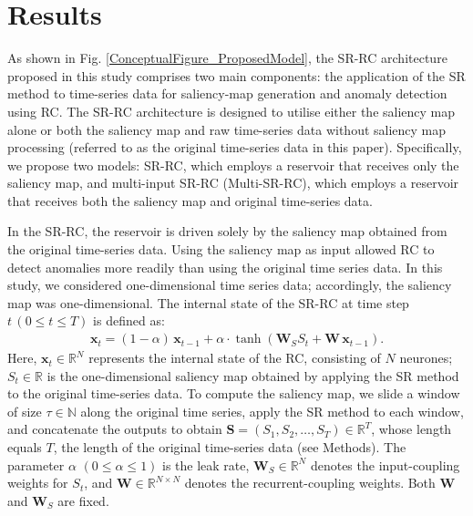 \documentclass[pdflatex,sn-nature]{sn-jnl}
\theoremstyle{thmstyleone}%
\theoremstyle{thmstyletwo}%
\theoremstyle{thmstylethree}%
\begin{document}
\section*{Results}
As shown in Fig. \ref{ConceptualFigure_ProposedModel}, the SR-RC architecture proposed in this study comprises two main components: the application of the SR method to time-series data for saliency-map generation and anomaly detection using RC.
The SR-RC architecture is designed to utilise either the saliency map alone or both the saliency map and raw time-series data without saliency map processing (referred to as the original time-series data in this paper).
Specifically, we propose two models: SR-RC, which employs a reservoir that receives only the saliency map, and multi-input SR-RC (Multi-SR-RC), which employs a reservoir that receives both the saliency map and original time-series data.

In the SR-RC, the reservoir is driven solely by the saliency map obtained from the original time-series data.
Using the saliency map as input allowed RC to detect anomalies more readily than using the original time series data.
In this study, we considered one-dimensional time series data; accordingly, the saliency map was one-dimensional.
The internal state of the SR-RC at time step $t\,(0 \le t \le T)$ is defined as:
\begin{align}
    \mathbf{x}_{t} = (1-\alpha)\,\mathbf{x}_{t-1} + \alpha \cdot \tanh\left(\mathbf{W}_{S}S_{t} + \mathbf{W}\,\mathbf{x}_{t-1}\right). \label{eq:SR-RC}
\end{align}
Here, $\mathbf{x}_{t} \in \mathbb{R}^{N}$ represents the internal state of the RC, consisting of $N$ neurones; $S_{t} \in \mathbb{R}$ is the one-dimensional saliency map obtained by applying the SR method to the original time-series data.
To compute the saliency map, we slide a window of size $\tau \in \mathbb{N}$ along the original time series, apply the SR method to each window, and concatenate the outputs to obtain $\mathbf{S}=(S_{1},S_{2},\ldots,S_{T})\in \mathbb{R}^{T}$, whose length equals $T$, the length of the original time-series data (see Methods).
The parameter $\alpha$ $(0 \le \alpha \le 1)$ is the leak rate, $\mathbf{W}_{S} \in \mathbb{R}^{N}$ denotes the input-coupling weights for $S_{t}$, and $\mathbf{W} \in \mathbb{R}^{N \times N}$ denotes the recurrent-coupling weights.
Both $\mathbf{W}$ and $\mathbf{W}_{S}$ are fixed.
\end{document}
